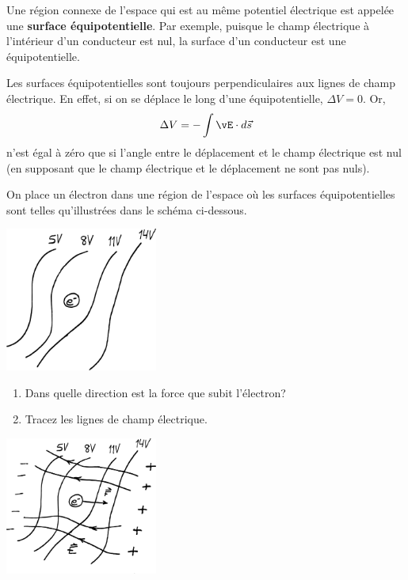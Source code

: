 
Une région connexe de l'espace qui est au même potentiel électrique est appelée
une \textbf{surface équipotentielle}. Par exemple, puisque le champ électrique
à l'intérieur d'un conducteur est nul, la surface d'un conducteur est une
équipotentielle.

Les surfaces équipotentielles sont toujours perpendiculaires aux lignes de
champ électrique. En effet, si on se déplace le long d'une équipotentielle,
$\Delta V = 0$. Or,
\[
  \Delta V = - \int \vE \cdot d\vec{s}
\]
n'est égal à zéro que si l'angle entre le déplacement et le champ électrique
est nul (en supposant que le champ électrique et le déplacement ne sont pas
nuls).


\begin{diapobox}

  On place un électron dans une région de l'espace où les surfaces
  équipotentielles sont telles qu'illustrées dans le schéma ci-dessous.

  \begin{center}
    \includegraphics[width=5cm]{04-potentiel/figures/exercice-equipotentielles.pdf}
  \end{center}

  \begin{enumerate}
    \item Dans quelle direction est la force que subit l'électron?
    \item Tracez les lignes de champ électrique.
  \end{enumerate}
\end{diapobox}

\begin{reponsebox}
  \begin{center}
    \includegraphics[width=5cm]{04-potentiel/figures/exercice-equipotentielles-solution.pdf}
  \end{center}
\end{reponsebox}


